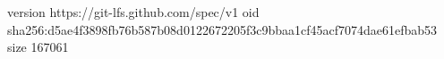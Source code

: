 version https://git-lfs.github.com/spec/v1
oid sha256:d5ae4f3898fb76b587b08d0122672205f3c9bbaa1cf45acf7074dae61efbab53
size 167061
